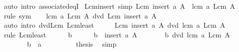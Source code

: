 \begin{isabellebody}
\ {\isacharparenleft}{\kern0pt}auto\ intro{\isacharcolon}{\kern0pt}\ associated{\isacharunderscore}{\kern0pt}eqI{\isacharparenright}{\kern0pt}\isanewline
{}\isamarkupfalse%
%
\endisatagproof
{\isafoldproof}%
%
\isadelimproof
\isanewline
%
\endisadelimproof
\isanewline
{}\isamarkupfalse%
\ Lcm{\isacharunderscore}{\kern0pt}insert\ {\isacharbrackleft}{\kern0pt}simp{\isacharbrackright}{\kern0pt}{\isacharcolon}{\kern0pt}\ {\isachardoublequoteopen}Lcm\ {\isacharparenleft}{\kern0pt}insert\ a\ A{\isacharparenright}{\kern0pt}\ {\isacharequal}{\kern0pt}\ lcm\ a\ {\isacharparenleft}{\kern0pt}Lcm\ A{\isacharparenright}{\kern0pt}{\isachardoublequoteclose}\isanewline
%
\isadelimproof
%
\endisadelimproof
%
\isatagproof
{}\isamarkupfalse%
\ {\isacharparenleft}{\kern0pt}rule\ sym{\isacharparenright}{\kern0pt}\isanewline
\ \ \isamarkupfalse%
\ {\isachardoublequoteopen}lcm\ a\ {\isacharparenleft}{\kern0pt}Lcm\ A{\isacharparenright}{\kern0pt}\ dvd\ Lcm\ {\isacharparenleft}{\kern0pt}insert\ a\ A{\isacharparenright}{\kern0pt}{\isachardoublequoteclose}\isanewline
\ \ \ \ \isamarkupfalse%
\ {\isacharparenleft}{\kern0pt}auto\ intro{\isacharcolon}{\kern0pt}\ dvd{\isacharunderscore}{\kern0pt}Lcm\ Lcm{\isacharunderscore}{\kern0pt}least{\isacharparenright}{\kern0pt}\isanewline
\ \ \isamarkupfalse%
\ \isamarkupfalse%
\ {\isachardoublequoteopen}Lcm\ {\isacharparenleft}{\kern0pt}insert\ a\ A{\isacharparenright}{\kern0pt}\ dvd\ lcm\ a\ {\isacharparenleft}{\kern0pt}Lcm\ A{\isacharparenright}{\kern0pt}{\isachardoublequoteclose}\isanewline
\ \ \isamarkupfalse%
\ {\isacharparenleft}{\kern0pt}rule\ Lcm{\isacharunderscore}{\kern0pt}least{\isacharparenright}{\kern0pt}\isanewline
\ \ \ \ \isamarkupfalse%
\ b\isanewline
\ \ \ \ \isamarkupfalse%
\ {\isachardoublequoteopen}b\ {\isasymin}\ insert\ a\ A{\isachardoublequoteclose}\isanewline
\ \ \ \ \isamarkupfalse%
\ \isamarkupfalse%
\ {\isachardoublequoteopen}b\ dvd\ lcm\ a\ {\isacharparenleft}{\kern0pt}Lcm\ A{\isacharparenright}{\kern0pt}{\isachardoublequoteclose}\isanewline
\ \ \ \ \isamarkupfalse%
\isanewline
\ \ \ \ \ \ \isamarkupfalse%
\ {\isachardoublequoteopen}b\ {\isacharequal}{\kern0pt}\ a{\isachardoublequoteclose}\isanewline
\ \ \ \ \ \ \isamarkupfalse%
\ \isamarkupfalse%
\ {\isacharquery}{\kern0pt}thesis\ \isamarkupfalse%
\ simp\isanewline
\ \ \ \ \isamarkupfalse%

\end{isabellebody}
